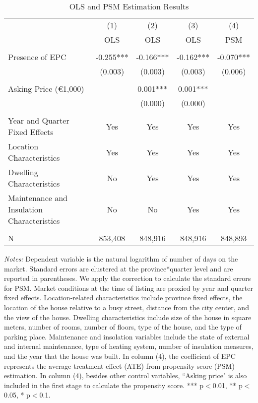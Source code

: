 \documentclass[12pt]{article}
\begin{document}
\clearpage
\newpage
\begin{table}[H]
\footnotesize
  \centering
  \caption{OLS and PSM Estimation Results}
      \begin{tabular}{lcccc}
\hline
                &\multicolumn{1}{c}{(1)}&\multicolumn{1}{c}{(2)}&\multicolumn{1}{c}{(3)}&\multicolumn{1}{c}{(4)}\\
&OLS                     & OLS& OLS& PSM \\
\hline
&&&&\\
 Presence of EPC	 & -0.255*** & -0.166*** & -0.162***& -0.070***\\
& (0.003) & (0.003) & (0.003) & (0.006) \\
&&&&\\
Asking Price (\euro 1,000)	& & 	0.001***& 	0.001***& \\
& &  (0.000) & (0.000) & \\
&&&&\\
Year and Quarter Fixed Effects & Yes & Yes & Yes & Yes \\
Location Characteristics & Yes & Yes & Yes & Yes \\
Dwelling Characteristics & No & Yes & Yes & Yes \\
Maintenance and Insulation Characteristics & No & No & Yes & Yes \\
&&&&\\
N	& 853,408 &	848,916 &	848,916 &	848,893 \\
\hline

    \end{tabular}%
\begin{tablenotes}
\scriptsize
\item \textit{Notes:} Dependent variable is the natural logarithm of number of days on the market. Standard errors are clustered at the province*quarter level and are reported in parentheses. We apply the \citep{abadie2016matching} correction to calculate the standard errors for PSM. Market conditions at the time of listing are proxied by year and quarter fixed effects. Location-related characteristics include province fixed effects, the location of the house relative to a busy street, distance from the city center, and the view of the house. Dwelling characteristics include size of the house in square meters, number of rooms, number of floors, type of the house, and the type of parking place. Maintenance and insolation variables include the state of external and internal maintenance, type of heating system, number of insulation measures, and the year that the house was built. In column (4), the coefficient of EPC represents the average treatment effect (ATE) from propensity score (PSM) estimation. In column (4), besides other control variables, ``Asking price" is also included in the first stage to calculate the propensity score.   *** p$<$0.01, ** p$<$0.05, * p$<$0.1. 
\end{tablenotes}

  \label{tab:addlabel}%
\end{table}%
\end{document}
